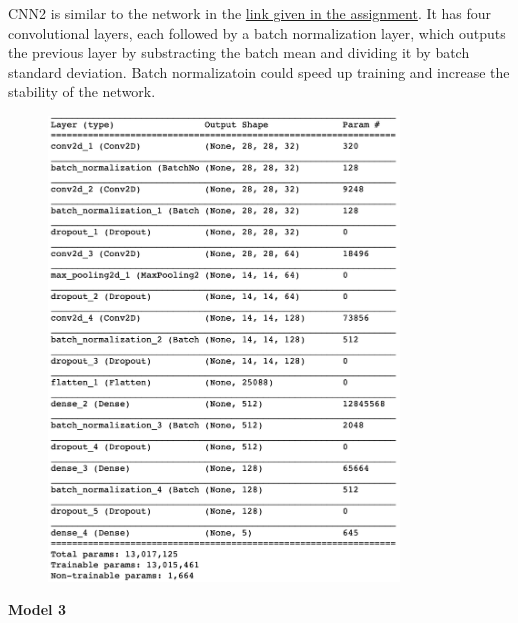 \documentclass[12pt]{article}
\begin{document}
CNN2 is similar to the network in the \href{https://www.kaggle.com/fuzzywizard/fashion-mnist-cnn-keras-accuracy-93/}{link given in the assignment}. It has four convolutional layers, each followed by a batch normalization layer, which outputs the previous layer by substracting the batch mean and dividing it by batch standard deviation. Batch normalizatoin could speed up training and increase the stability of the network.
\begin{figure}[H]
\begin{center}
    \includegraphics[width=0.83\textwidth]{../plots/2.png}
\end{center}
\end{figure}
\vspace*{-1.0cm}

\textbf{Model 3}
\end{document}
